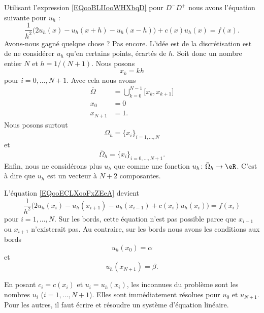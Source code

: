Utilisant l'expression \eqref{EQooBLIIooWHXbqD} pour \( D^-D^+\) nous avons l'équation suivante pour \( u_h\) :
\begin{equation}        \label{EQooECLXooFxZEeA}
    \frac{1}{ h^2 }\Big( 2u_h(x)-u_h(x+h)-u_h(x-h) \Big)+c(x)u_h(x)=f(x).
\end{equation}
Avons-nous gagné quelque chose ? Pas encore. L'idée est de la discrétisation est de ne considérer \( u_h\) qu'en certains points, écartés de \( h\). Soit donc un nombre entier \( N\) et \( h=1/(N+1)\). Nous posons
\begin{equation}
    x_k=kh
\end{equation}
pour \( i=0,\ldots, N+1\). Avec cela nous avons
\begin{subequations}
    \begin{align}
        \overline{ \Omega }&=\bigcup_{k=0}^{N-1}\mathopen[ x_k , x_{k+1} \mathclose]\\
        x_0&=0\\
        x_{N+1}&=1.
    \end{align}
\end{subequations}
Nous posons surtout
\begin{equation}
    \Omega_h=\{ x_i \}_{i=1,\ldots, N}
\end{equation}
et
\begin{equation}
    \bar\Omega_h=\{ x_i \}_{i=0,\ldots, N+1}.
\end{equation}
Enfin, nous ne considérons plus \( u_h\) que comme une fonction \( u_h\colon \bar\Omega_h\to \eR\). C'est à dire que \( u_h\) est un vecteur à \( N+2\) composantes.

L'équation \eqref{EQooECLXooFxZEeA} devient
\begin{equation}        \label{EQooZMVMooTqlpkF}
    \frac{1}{ h^2 }\big( 2u_h(x_i)-u_h(x_{i+1})-u_h(x_{i-1})+c(x_i)u_h(x_i) \big)=f(x_i)
\end{equation}
pour \( i=1,\ldots, N\). Sur les bords, cette équation n'est pas possible parce que \( x_{i-1}\) ou \( x_{i+1}\) n'existerait pas. Au contraire, sur les bords nous avons les conditions aux bords
\begin{equation}
    u_h(x_0)=\alpha
\end{equation}
et
\begin{equation}
    u_h(x_{N+1})=\beta.
\end{equation}

En posant \( c_i=c(x_i)\) et \( u_i=u_h(x_i)\), les inconnues du problème sont les nombres \( u_i\) (\( i=1,\ldots, N+1\)). Elles sont immédiatement résolues pour \( u_0\) et \( u_{N+1}\). Pour les autres, il faut écrire et résoudre un système d'équation linéaire.

